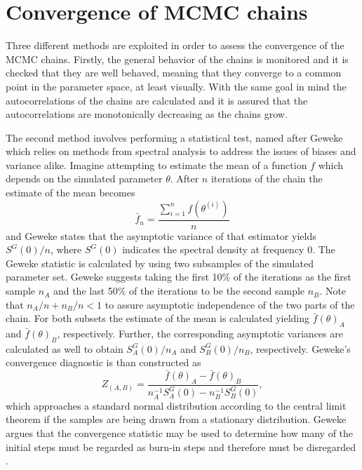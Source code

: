 \documentclass[a4paper,fleqn,usenatbib]{mnras}
\begin{document}
\section{Convergence of MCMC chains}
\label{sec:convergence}
Three different methods are exploited in order to assess the convergence of the MCMC chains. Firstly, the general behavior of the chains is monitored and it is checked that they are well behaved, meaning that they converge to a common point in the parameter space, at least visually. With the same goal in mind the autocorrelations of the chains are calculated and it is assured that the autocorrelations are monotonically decreasing as the chains grow.

The second method involves performing a statistical test, named after Geweke \citet{geweke1991evaluating} which relies on methods from spectral analysis to address the issues of biases and variance alike. Imagine attempting to estimate the mean of a function $f$ which depends on the simulated parameter $\theta$. After $n$ iterations of the chain the estimate of the mean becomes
\begin{equation}
\bar{f}_n=\frac{\sum_{i=1}^n f(\theta^{(i)})}{n}
\end{equation}
and Geweke states that the asymptotic variance of that estimator yields $S^G(0)/n$, where $S^G(0)$ indicates the spectral density at frequency 0. The Geweke statistic is calculated by using two subsamples of the simulated parameter set. Geweke suggests taking the first 10\% of the iterations as the first sample $n_A$ and the last 50\% of the iterations to be the second sample $n_B$. Note that $n_A/n + n_B/n < 1$ to assure asymptotic independence of the two parts of the chain. For both subsets the estimate of the mean is calculated yielding $\bar{f}(\theta)_A$ and $\bar{f}(\theta)_B$, respectively. Further, the corresponding asymptotic variances are calculated as well to obtain $S^G_A(0)/n_A$ and $S^G_B(0)/n_B$, respectively. Geweke's convergence diagnostic is than constructed as
\begin{equation}
Z_{(A,B)}=\frac{\bar{f}(\theta)_A-\bar{f}(\theta)_B}{n_A^{-1}S^G_A(0)-n_B^{-1}S^G_B(0)},
\end{equation}
which approaches a standard normal distribution according to the central limit theorem if the samples are being drawn from a stationary distribution. Geweke argues that the convergence statistic may be used to determine how many of the initial steps must be regarded as burn-in steps and therefore must be disregarded \citet{cowles1996markov}.
\end{document}
